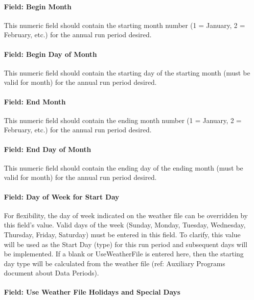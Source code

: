 \paragraph{Field: Begin Month}\label{field-begin-month-1}

This numeric field should contain the starting month number (1 = January, 2 = February, etc.) for the annual run period desired.

\paragraph{Field: Begin Day of Month}\label{field-begin-day-of-month-1}

This numeric field should contain the starting day of the starting month (must be valid for month) for the annual run period desired.

\paragraph{Field: End Month}\label{field-end-month-1}

This numeric field should contain the ending month number (1 = January, 2 = February, etc.) for the annual run period desired.

\paragraph{Field: End Day of Month}\label{field-end-day-of-month-1}

This numeric field should contain the ending day of the ending month (must be valid for month) for the annual run period desired.

\paragraph{Field: Day of Week for Start Day}\label{field-day-of-week-for-start-day-2}

For flexibility, the day of week indicated on the weather file can be overridden by this field's value. Valid days of the week (Sunday, Monday, Tuesday, Wednesday, Thursday, Friday, Saturday) must be entered in this field. To clarify, this value will be used as the Start Day (type) for this run period and subsequent days will be implemented. If a blank or UseWeatherFile is entered here, then the starting day type will be calculated from the weather file (ref: Auxiliary Programs document about Data Periods).

\paragraph{Field: Use Weather File Holidays and Special Days}\label{field-use-weather-file-holidays-and-special-days}


